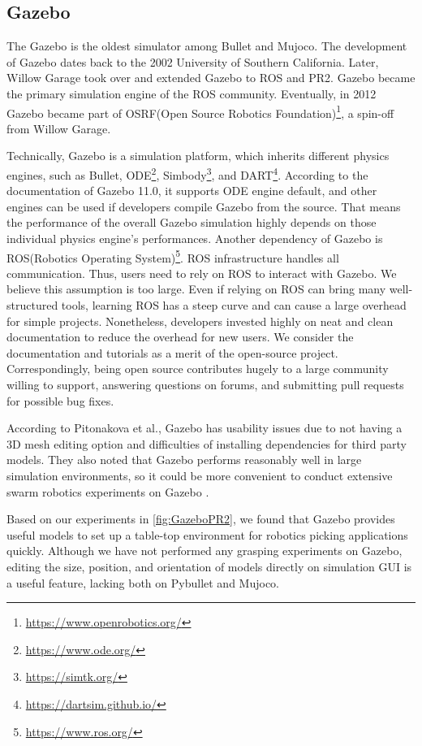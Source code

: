 \subsection{Gazebo}

The Gazebo is the oldest simulator among Bullet and Mujoco. The development of Gazebo dates back to the 2002 University of Southern California. Later, Willow Garage took over and extended Gazebo to ROS and PR2. Gazebo became the primary simulation engine of the ROS community. Eventually, in 2012 Gazebo became part of OSRF(Open Source Robotics Foundation)\footnote{\url{https://www.openrobotics.org/}}, a spin-off from Willow Garage.

Technically, Gazebo is a simulation platform, which inherits different physics engines, such as Bullet, ODE\footnote{\url{https://www.ode.org/}}, Simbody\footnote{\url{https://simtk.org/}}, and DART\footnote{\url{https://dartsim.github.io/}}. According to the documentation of Gazebo 11.0, it supports ODE engine default, and other engines can be used if developers compile Gazebo from the source. That means the performance of the overall Gazebo simulation highly depends on those individual physics engine’s performances.  Another dependency of Gazebo is ROS(Robotics Operating System)\footnote{\url{https://www.ros.org/}}. ROS infrastructure handles all communication. Thus, users need to rely on ROS to interact with Gazebo. We believe this assumption is too large. Even if relying on ROS can bring many well-structured tools, learning ROS has a steep curve and can cause a large overhead for simple projects.
Nonetheless, developers invested highly on neat and clean documentation to reduce the overhead for new users. We consider the documentation and tutorials as a merit of the open-source project. Correspondingly, being open source contributes hugely to a large community willing to support, answering questions on forums, and submitting pull requests for possible bug fixes. 

According to Pitonakova et al., Gazebo has usability issues due to not having a 3D mesh editing option and difficulties of installing dependencies for third party models. They also noted that Gazebo performs reasonably well in large simulation environments, so it could be more convenient to conduct extensive swarm robotics experiments on Gazebo \cite{Pitonakova2018}.  

Based on our experiments in \ref{fig:GazeboPR2}, we found that Gazebo provides useful models to set up a table-top environment for robotics picking applications quickly. Although we have not performed any grasping experiments on Gazebo, editing the size, position, and orientation of models directly on simulation GUI is a useful feature, lacking both on Pybullet and Mujoco.


